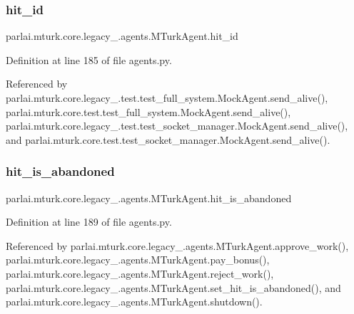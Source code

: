 \subsubsection{\texorpdfstring{hit\+\_\+id}{hit\_id}}
{\footnotesize\ttfamily parlai.\+mturk.\+core.\+legacy\+\_.\+agents.\+M\+Turk\+Agent.\+hit\+\_\+id}



Definition at line 185 of file agents.\+py.



Referenced by parlai.\+mturk.\+core.\+legacy\+\_.\+test.\+test\+\_\+full\+\_\+system.\+Mock\+Agent.\+send\+\_\+alive(), parlai.\+mturk.\+core.\+test.\+test\+\_\+full\+\_\+system.\+Mock\+Agent.\+send\+\_\+alive(), parlai.\+mturk.\+core.\+legacy\+\_.\+test.\+test\+\_\+socket\+\_\+manager.\+Mock\+Agent.\+send\+\_\+alive(), and parlai.\+mturk.\+core.\+test.\+test\+\_\+socket\+\_\+manager.\+Mock\+Agent.\+send\+\_\+alive().

\mbox{\label{classparlai_1_1mturk_1_1core_1_1legacy__2018_1_1agents_1_1MTurkAgent_a0868e228425ecdfbab0824ed4fcfdcc8}} 
\subsubsection{\texorpdfstring{hit\+\_\+is\+\_\+abandoned}{hit\_is\_abandoned}}
{\footnotesize\ttfamily parlai.\+mturk.\+core.\+legacy\+\_.\+agents.\+M\+Turk\+Agent.\+hit\+\_\+is\+\_\+abandoned}



Definition at line 189 of file agents.\+py.



Referenced by parlai.\+mturk.\+core.\+legacy\+\_.\+agents.\+M\+Turk\+Agent.\+approve\+\_\+work(), parlai.\+mturk.\+core.\+legacy\+\_.\+agents.\+M\+Turk\+Agent.\+pay\+\_\+bonus(), parlai.\+mturk.\+core.\+legacy\+\_.\+agents.\+M\+Turk\+Agent.\+reject\+\_\+work(), parlai.\+mturk.\+core.\+legacy\+\_.\+agents.\+M\+Turk\+Agent.\+set\+\_\+hit\+\_\+is\+\_\+abandoned(), and parlai.\+mturk.\+core.\+legacy\+\_.\+agents.\+M\+Turk\+Agent.\+shutdown().

